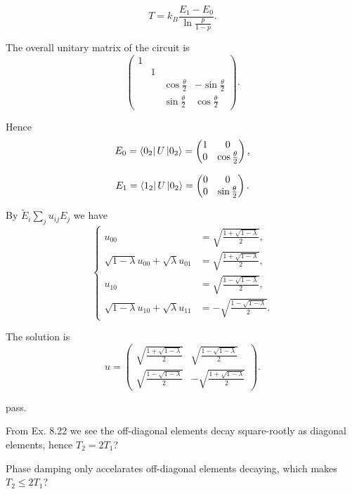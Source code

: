 \ex \todo

\ex $$T=k_B\frac{E_1-E_0}{\ln\frac{p}{1-p}}.$$

\ex The overall unitary matrix of the circuit is
$$\begin{pmatrix}
    1 & & & \\
    & 1 & & \\
    & & \cos\frac{\theta}{2} & -\sin\frac{\theta}{2} \\
    & & \sin\frac{\theta}{2} & \cos\frac{\theta}{2}
\end{pmatrix}.$$

Hence
$$E_0 = \left\langle0_2\right|U\left|0_2\right\rangle = \begin{pmatrix}
    1 & 0 \\
    0 & \cos\frac{\theta}{2}
\end{pmatrix},$$

$$E_1 = \left\langle1_2\right|U\left|0_2\right\rangle = \begin{pmatrix}
    0 & 0 \\
    0 & \sin\frac{\theta}{2}
\end{pmatrix}.$$

\ex By $\tilde{E}_i\sum_ju_{ij}E_j$ we have
$$\begin{cases}
    u_{00} & = \sqrt{\frac{1+\sqrt{1-\lambda}}{2}}, \\
    \sqrt{1-\lambda} u_{00} + \sqrt{\lambda} u_{01} & = \sqrt{\frac{1+\sqrt{1-\lambda}}{2}}, \\
    u_{10} & = \sqrt{\frac{1-\sqrt{1-\lambda}}{2}}, \\
    \sqrt{1-\lambda} u_{10} + \sqrt{\lambda} u_{11} & = -\sqrt{\frac{1-\sqrt{1-\lambda}}{2}}.
\end{cases}$$

The solution is
$$
u=\begin{pmatrix}
    \sqrt{\frac{1+\sqrt{1-\lambda}}{2}} & \sqrt{\frac{1-\sqrt{1-\lambda}}{2}} \\
    \sqrt{\frac{1-\sqrt{1-\lambda}}{2}} & -\sqrt{\frac{1+\sqrt{1-\lambda}}{2}}
\end{pmatrix}.
$$

\ex \todo

\ex pass.

\ex \redstar From Ex. 8.22 we see the off-diagonal elements decay square-rootly as diagonal elements, hence $T_2=2T_1$?

Phase damping only accelarates off-diagonal elements decaying, which makes $T_2\le 2T_1$?

\ex \todo